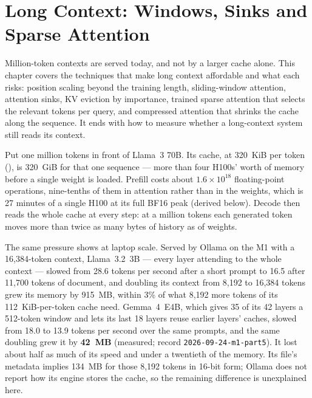 \chapter{Long Context: Windows, Sinks and Sparse Attention}\label{ch:long-context}

\begin{ChapterIntent}
Million-token contexts are served today, and not by a larger cache alone.
This chapter covers the techniques that make long context affordable and what
each risks: position scaling beyond the training length, sliding-window
attention, attention sinks, KV eviction by importance, trained sparse
attention that selects the relevant tokens per query, and compressed attention
that shrinks the cache along the sequence. It ends with how to measure whether
a long-context system still reads its context.
\end{ChapterIntent}


Put one million tokens in front of Llama~3 70B. Its cache, at 320~KiB per
token (), is 320~GiB for that one sequence --- more than
four H100s' worth of memory before a single weight is loaded. Prefill costs about
$1.6\times10^{18}$ floating-point operations, nine-tenths of them in attention
rather than in the weights, which is 27 minutes of a single H100 at its full
BF16 peak (derived below). Decode then reads the whole cache at every step:
at a million tokens each generated token moves more than twice as many bytes of
history as of weights.

The same pressure shows at laptop scale. Served by Ollama on the M1 with a
16,384-token context, Llama~3.2~3B --- every layer attending to the whole
context --- slowed from 28.6 tokens per second after a short prompt to 16.5
after 11,700 tokens of document, and doubling its context from 8,192 to 16,384
tokens grew its memory by 915~MB, within 3\% of what 8,192 more tokens of its
112~KiB-per-token cache need. Gemma~4~E4B, which gives 35 of its 42 layers a
512-token window and lets its last 18 layers reuse earlier layers' caches,
slowed from 18.0 to 13.9 tokens per second over the same prompts, and the same
doubling grew it by \textbf{42~MB} (measured; record
\texttt{2026-09-24-m1-part5}). It lost about half as much of its speed and
under a twentieth of the memory. Its file's metadata implies 134~MB for those
8,192 tokens in 16-bit form; Ollama does not report how its engine stores the
cache, so the remaining difference is unexplained here.

